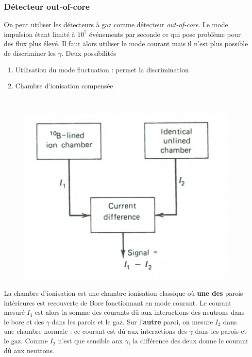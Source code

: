 \subsubsection{Détecteur out-of-core}
On peut utiliser les détecteurs à gaz comme détecteur \textit{out-of-core}. Le mode impulsion étant
limité à $10^7$ événements par seconde ce qui pose problème pour des flux plus élevé. Il faut alors
utiliser le mode courant mais il n'est plus possible de discriminer les $\gamma$. Deux possibilités
	\begin{enumerate}
	\item Utilisation du mode fluctuation : permet la discrimination
	\item Chambre d'ionisation compensée
	\end{enumerate}\ 


	\begin{figure}
	\vspace{-5mm}
	\includegraphics[scale=0.3]{ch11/image4}
	\end{figure}
	
La chambre d'ionisation est une chambre ionisation classique où \textbf{une des} parois intérieures
est recouverte de Bore fonctionnant en mode courant. Le courant mesuré $I_1$ est alors la somme 
des courants dû aux interactions des neutrons dans le bore et des $\gamma$ dans les parois et le 
gaz. Sur l'\textbf{autre} paroi, on mesure $I_2$ dans une chambre normale : ce courant est dû aux
interactions des $\gamma$ dans les parois et le gaz. Comme $I_2$ n'est que sensible aux $\gamma$, la
différence des deux donne le courant dû aux neutrons.

